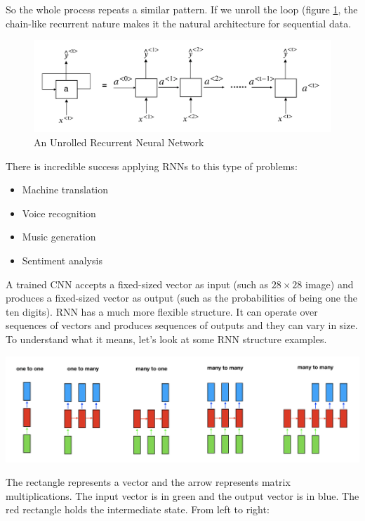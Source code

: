 \documentclass[
  12pt,
]{krantz}
\providecommand{\tightlist}{%
  \setlength{\itemsep}{0pt}\setlength{\parskip}{0pt}}
\begin{document}
So the whole process repeats a similar pattern. If we unroll the loop (figure \ref{fig:unrolledrnn}, the chain-like recurrent nature makes it the natural architecture for sequential data.

\begin{figure}

{\centering \includegraphics[width=0.9\linewidth]{images/rnnrollout} 

}

\caption{An Unrolled Recurrent Neural Network}\label{fig:unrolledrnn}
\end{figure}

There is incredible success applying RNNs to this type of problems:

\begin{itemize}
\tightlist
\item
  Machine translation
\item
  Voice recognition
\item
  Music generation
\item
  Sentiment analysis
\end{itemize}

A trained CNN accepts a fixed-sized vector as input (such as \(28 \times 28\) image) and produces a fixed-sized vector as output (such as the probabilities of being one the ten digits). RNN has a much more flexible structure. It can operate over sequences of vectors and produces sequences of outputs and they can vary in size. To understand what it means, let's look at some RNN structure examples.

\includegraphics[width=1\textwidth,height=\textheight]{images/rnnstrs.png}

The rectangle represents a vector and the arrow represents matrix multiplications. The input vector is in green and the output vector is in blue. The red rectangle holds the intermediate state. From left to right:
\end{document}
